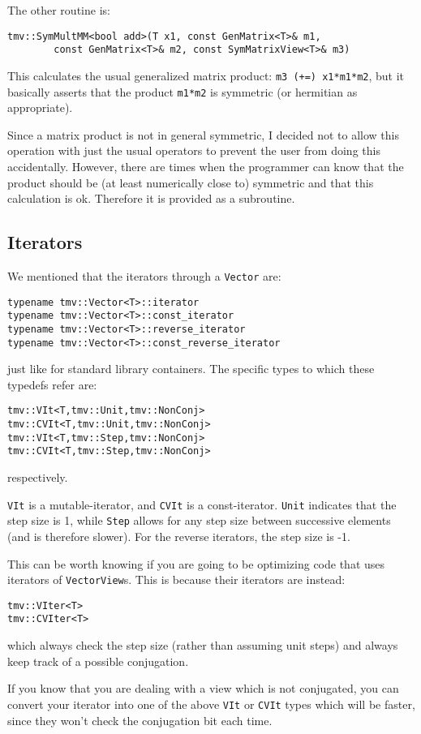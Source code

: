 \documentclass[twoside,letterpaper,11pt]{article}
\renewcommand{\tt}[1]{{\texttt {#1}}}
\begin{document}
The other routine is:
\begin{verbatim}
tmv::SymMultMM<bool add>(T x1, const GenMatrix<T>& m1, 
        const GenMatrix<T>& m2, const SymMatrixView<T>& m3)
\end{verbatim}
This calculates the usual generalized matrix product:
\tt{m3 (+=) x1*m1*m2}, but it basically
asserts that the product \tt{m1*m2} is symmetric (or hermitian as appropriate).

Since a matrix product is not in general symmetric, I decided not to allow 
this operation with just the usual operators to prevent the user from doing 
this accidentally.  However, there are times when the 
programmer can know that the product should be (at least numerically close to)
symmetric and that this calculation is ok.  Therefore it is provided as a subroutine.

\subsection{Iterators}

We mentioned that the iterators through a \tt{Vector} are:
\begin{verbatim}
typename tmv::Vector<T>::iterator
typename tmv::Vector<T>::const_iterator
typename tmv::Vector<T>::reverse_iterator
typename tmv::Vector<T>::const_reverse_iterator
\end{verbatim}
just like for standard library containers.  The specific types to which these
typedefs refer are:
\begin{verbatim}
tmv::VIt<T,tmv::Unit,tmv::NonConj>
tmv::CVIt<T,tmv::Unit,tmv::NonConj>
tmv::VIt<T,tmv::Step,tmv::NonConj>
tmv::CVIt<T,tmv::Step,tmv::NonConj>
\end{verbatim}
respectively.

\tt{VIt} is a mutable-iterator, and \tt{CVIt} is a const-iterator.  \tt{Unit} 
indicates that the step size is 1, while \tt{Step} allows for any step size
between successive elements (and is therefore slower).  For the reverse
iterators, the step size is -1.

This can be worth knowing if you are going to be optimizing code that uses
iterators of \tt{VectorView}s.
This is because their iterators are instead:
\begin{verbatim}
tmv::VIter<T>
tmv::CVIter<T>
\end{verbatim}
which always check the step size (rather than assuming unit steps) and always
keep track of a possible conjugation.

If you know that you are dealing with a view which is not conjugated, you can 
convert your iterator into one of the above \tt{VIt} or \tt{CVIt} types which will be 
faster, since they won't check the conjugation bit each time. 
\end{document}
